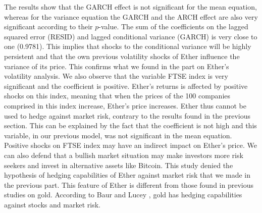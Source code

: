 \documentclass[11pt]{report}
\begin{document}
The results show that the GARCH effect is not significant for the mean equation, whereas for the variance equation the GARCH and the ARCH effect are also very significant according to their $p$-value. The sum of the coefficients on the lagged squared error (RESID) and lagged conditional variance (GARCH) is very close to one (0.9781). This implies that shocks to the conditional variance will be highly persistent and that the own previous volatility shocks of Ether influence the variance of its price. This confirms what we found in the part on Ether’s volatility analysis. \newline
We also observe that the variable FTSE index is very significant and the coefficient is positive. Ether’s returns is affected by positive shocks on this index, meaning that when the prices of the 100 companies comprised in this index increase, Ether’s price increases. Ether thus cannot be used to hedge against market risk, contrary to the results found in the previous section. This can be explained by the fact that the coefficient is not high and this variable, in our previous model, was not significant in the mean equation. Positive shocks on FTSE index may have an indirect impact on Ether’s price. We can also defend that a bullish market situation may make investors more risk seekers and invest in alternative assets like Bitcoin. \newline
This study denied the hypothesis of hedging capabilities of Ether against market risk that we made in the previous part. This feature of Ether is different from those found in previous studies on gold. According to Baur and Lucey \cite{BAUR}, gold has hedging capabilities against stocks and market risk.  


  	\clearpage
\end{document}
